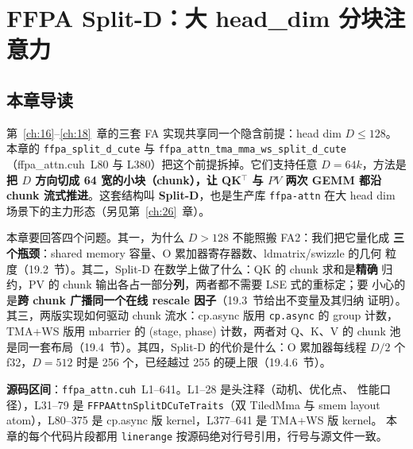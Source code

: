 \chapter{FFPA Split-D：大 head\_dim 分块注意力}\label{ch:19}

\section{本章导读}

第~\ref{ch:16}--\ref{ch:18}~章的三套 FA 实现共享同一个隐含前提：head dim $D \le 128$。
本章的 \texttt{ffpa\_\allowbreak{}split\_\allowbreak{}d\_\allowbreak{}cute} 与
\texttt{ffpa\_attn\_}\allowbreak\texttt{tma\_}\allowbreak\texttt{mma\_ws\_}\allowbreak\texttt{split\_\allowbreak{}d\_\allowbreak{}cute}
（ffpa\_attn.cuh~L80 与 L380）把这个前提拆掉。它们支持任意 $D = 64k$，方法是
\textbf{把 $D$ 方向切成 64 宽的小块（chunk），让 QK${}^\top$ 与 $PV$ 两次 GEMM 都沿
chunk 流式推进}。这套结构叫 \textbf{Split-D}，也是生产库
\texttt{ffpa-attn} 在大 head dim 场景下的主力形态（另见第~\ref{ch:26}~章）。

本章要回答四个问题。其一，为什么 $D > 128$ 不能照搬 FA2：我们把它量化成
\textbf{三个瓶颈}：shared memory 容量、O 累加器寄存器数、ldmatrix/swizzle 的几何
粒度（19.2~节）。其二，Split-D 在数学上做了什么：QK 的 chunk 求和是\textbf{精确}
归约，PV 的 chunk 输出各占一部分\textbf{列}，两者都不需要 LSE 式的重标定；要
小心的是\textbf{跨 chunk 广播同一个在线 rescale 因子}（19.3~节给出不变量及其归纳
证明）。其三，两版实现如何驱动 chunk 流水：cp.async 版用 \texttt{cp.async}
的 group 计数，TMA+WS 版用 mbarrier 的 (stage, phase) 计数，两者对 Q、K、V 的
chunk 池是同一套布局（19.4~节）。其四，Split-D 的代价是什么：O 累加器每线程
$D/2$ 个 f32，$D = 512$ 时是 256 个，已经越过 255 的硬上限（19.4.6~节）。

\textbf{源码区间}：\texttt{ffpa\_\allowbreak{}attn.\allowbreak{}cuh}~L1--641。L1--28 是头注释（动机、优化点、
性能口径），L31--79 是 \texttt{FFPAAttn}\allowbreak\texttt{SplitDCuTe}\allowbreak\texttt{Traits}（双 TiledMma 与 smem
layout atom），L80--375 是 cp.async 版 kernel，L377--641 是 TMA+WS 版 kernel。
本章的每个代码片段都用 \texttt{linerange} 按源码绝对行号引用，行号与源文件一致。

